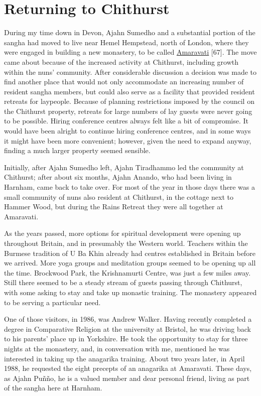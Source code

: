 \chapter{Returning to Chithurst}

During my time down in Devon, Ajahn Sumedho and a substantial portion of
the sangha had moved to live near Hemel Hempstead, north of London,
where they were engaged in building a new monastery, to be called
\href{https://www.amaravati.org/}{\underline{Amaravati}} {[}67{]}. The
move came about because of the increased activity at Chithurst,
including growth within the nuns' community. After considerable
discussion a decision was made to find another place that would not only
accommodate an increasing number of resident sangha members, but could
also serve as a facility that provided resident retreats for laypeople.
Because of planning restrictions imposed by the council on the Chithurst
property, retreats for large numbers of lay guests were never going to
be possible. Hiring conference centres always felt like a bit of
compromise. It would have been alright to continue hiring conference
centres, and in some ways it might have been more convenient; however,
given the need to expand anyway, finding a much larger property seemed
sensible.

Initially, after Ajahn Sumedho left, Ajahn Tiradhammo led the community
at Chithurst; after about six months, Ajahn Anando, who had been living
in Harnham, came back to take over. For most of the year in those days
there was a small community of nuns also resident at Chithurst, in the
cottage next to Hammer Wood, but during the Rains Retreat they were all
together at Amaravati.

As the years passed, more options for spiritual development were opening
up throughout Britain, and in presumably the Western world. Teachers
within the Burmese tradition of U Ba Khin already had centres
established in Britain before we arrived. More yoga groups and
meditation groups seemed to be opening up all the time. Brockwood Park,
the Krishnamurti Centre, was just a few miles away. Still there seemed
to be a steady stream of guests passing through Chithurst, with some
asking to stay and take up monastic training. The monastery appeared to
be serving a particular need.

One of those visitors, in 1986, was Andrew Walker. Having recently
completed a degree in Comparative Religion at the university at Bristol,
he was driving back to his parents' place up in Yorkshire. He took the
opportunity to stay for three nights at the monastery, and, in
conversation with me, mentioned he was interested in taking up the
anagarika training. About two years later, in April 1988, he requested
the eight precepts of an anagarika at Amaravati. These days, as Ajahn
Puñño, he is a valued member and dear personal friend, living as part of
the sangha here at Harnham.

